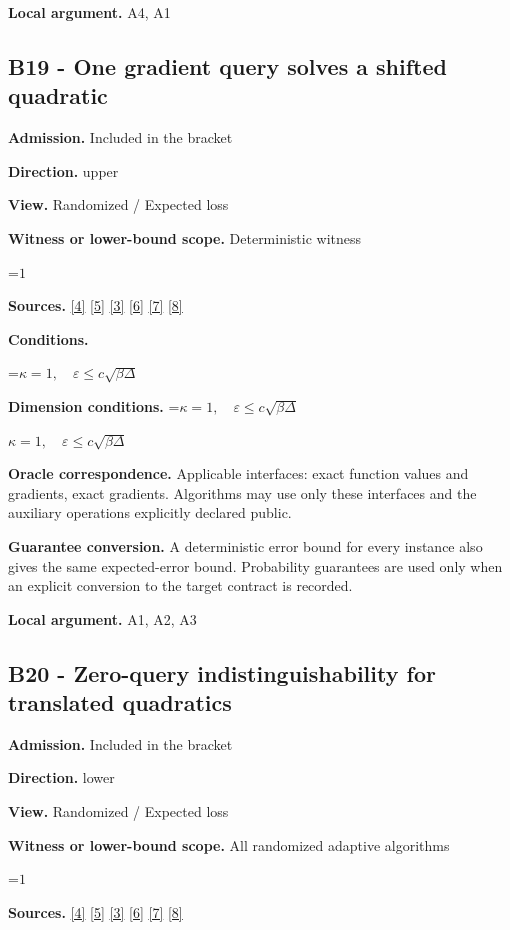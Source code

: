 \documentclass[10pt,a4paper]{article}
\newcommand{\AtlasMath}[1]{\par\begingroup\centering\setbox0=\hbox{$\displaystyle #1$}\ifdim\wd0>1.4\linewidth\typeout{ATLAS WIDE FORMULA: \the\wd0}\fi\ifdim\wd0>\linewidth\resizebox{\linewidth}{!}{\box0}\else\box0\fi\par\endgroup}
\newcommand{\AtlasInlineMath}[1]{\begingroup\setbox0=\hbox{$#1$}\ifdim\wd0>.4\linewidth\endgroup\AtlasMath{#1}\else\endgroup$#1$\fi}
\begin{document}
\textbf{Local argument.} A4, A1

\subsection{B19 - One gradient query solves a shifted quadratic}
\textbf{Admission.} Included in the bracket

\textbf{Direction.} upper

\textbf{View.} Randomized / Expected loss

\textbf{Witness or lower-bound scope.} Deterministic witness

\AtlasMath{1}
\textbf{Sources.} \href{https://arxiv.org/pdf/2101.09740v2}{[4]} \href{https://arxiv.org/pdf/2609.33360v2}{[5]} \href{https://arxiv.org/pdf/2609.10874}{[3]} \href{https://arxiv.org/pdf/1405.4980}{[6]} \href{https://www2.isye.gatech.edu/~nemirovs/MOR_AccuracyCertificates.pdf}{[7]} \href{https://arxiv.org/pdf/2609.20701}{[8]}

\textbf{Conditions.} 
\AtlasMath{\kappa=1,\quad\varepsilon\le c\sqrt{\beta\Delta}}


\textbf{Dimension conditions.} \AtlasInlineMath{\kappa=1,\quad\varepsilon\le c\sqrt{\beta\Delta}}

\textbf{Oracle correspondence.} Applicable interfaces: exact function values and gradients, exact gradients. Algorithms may use only these interfaces and the auxiliary operations explicitly declared public.

\textbf{Guarantee conversion.} A deterministic error bound for every instance also gives the same expected-error bound. Probability guarantees are used only when an explicit conversion to the target contract is recorded.

\textbf{Local argument.} A1, A2, A3

\subsection{B20 - Zero-query indistinguishability for translated quadratics}
\textbf{Admission.} Included in the bracket

\textbf{Direction.} lower

\textbf{View.} Randomized / Expected loss

\textbf{Witness or lower-bound scope.} All randomized adaptive algorithms

\AtlasMath{1}
\textbf{Sources.} \href{https://arxiv.org/pdf/2101.09740v2}{[4]} \href{https://arxiv.org/pdf/2609.33360v2}{[5]} \href{https://arxiv.org/pdf/2609.10874}{[3]} \href{https://arxiv.org/pdf/1405.4980}{[6]} \href{https://www2.isye.gatech.edu/~nemirovs/MOR_AccuracyCertificates.pdf}{[7]} \href{https://arxiv.org/pdf/2609.20701}{[8]}
\end{document}

